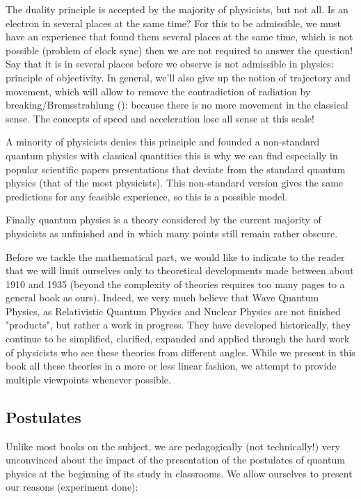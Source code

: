 	The duality principle is accepted by the majority of physicists, but not all. Is an electron in several places at the same time? For this to be admissible, we must have an experience that found them several places at the same time, which is not possible (problem of clock sync) then we are not required to answer the question! Say that it is in several places before we observe is not admissible in physics: principle of objectivity. In general, we'll also give up the notion of trajectory and movement, which will allow to remove the contradiction of radiation by breaking/Bremsstrahlung (): because there is no more movement in the classical sense. The concepts of speed and acceleration lose all sense at this scale!
	
	A minority of physicists denies this principle and founded a non-standard quantum physics with classical quantities this is why we can find especially in popular scientific papers presentations that deviate from the standard quantum physics (that of the most physicists). This non-standard version gives the same predictions for any feasible experience, so this is a possible model.
	
	Finally quantum physics is a theory considered by the current majority of physicists as unfinished and in which many points still remain rather obscure.
	
	Before we tackle the mathematical part, we would like to indicate to the reader that we will limit ourselves only to theoretical developments made between about 1910 and 1935 (beyond the complexity of theories requires too many pages to a general book as ours). Indeed, we very much believe that Wave Quantum Physics, as Relativistic Quantum Physics and Nuclear Physics are not finished "products", but rather a work in progress. They have developed historically, they continue to be simplified, clarified, expanded and applied through the hard work of physicists who see these theories from different angles. While we present in this book all these theories in a more or less linear fashion, we attempt to provide multiple viewpoints whenever possible.
	
	\pagebreak
	\subsection{Postulates}
	Unlike most books on the subject, we are pedagogically (not technically!) very unconvinced about the impact of the presentation of the postulates of quantum physics at the beginning of its study in classrooms. We allow ourselves to present our reasons (experiment done):
	
